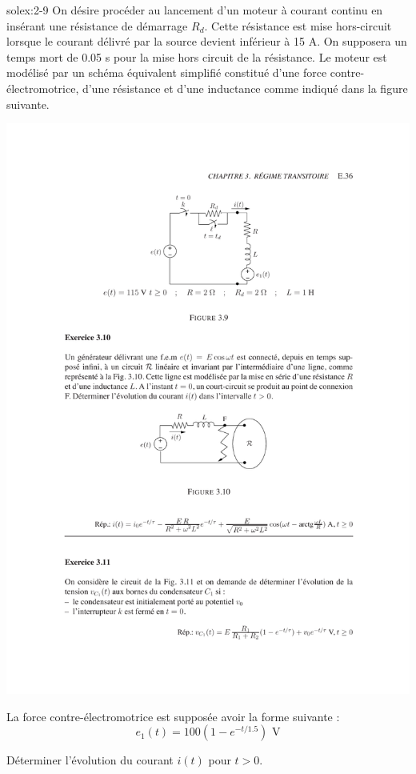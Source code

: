 \begin{exwithsol}{solex:2-9}
\label{ex:2-9}
On d\'esire proc\'eder au lancement d'un moteur \`a courant
continu en ins\'erant une r\'esistance de d\'emarrage $R_d$. Cette
r\'esistance est mise hors-circuit lorsque le courant d\'elivr\'e par la
source devient inf\'erieur \`a 15 A. On supposera un temps mort de 0.05 s
pour la mise hors circuit de la r\'esistance. Le moteur est mod\'elis\'e par
un sch\'ema \'equivalent simplifi\'e constitu\'e d'une force
contre-\'electromotrice, d'une r\'esistance et d'une  inductance comme
indiqu\'e dans la figure suivante.
\begin{center}
	\includegraphics[width=0.9\linewidth]{exercices/ex-3-9}
\end{center}
La force contre-\'electromotrice est suppos\'ee avoir la forme suivante :
\[e_1(t)=100(1-e^{-t/1.5})\,\, \mbox{V}\]

D\'eterminer l'\'evolution du courant $i(t)$ pour $t>0$.

\end{exwithsol}

